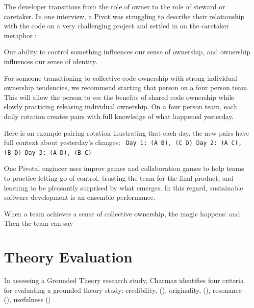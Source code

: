 \begin{table}[]
The developer transitions from the role of owner to the role of steward or caretaker. In one interview, a Pivot was struggling to describe their relationship with the code on a very challenging project and settled in on the caretaker metaphor : 

Our ability to control something influences our sense of ownership, and ownership influences our sense of identity. 

For someone transitioning to collective code ownership with strong individual ownership tendencies, we recommend starting that person on a four person team. This will allow the person to see the benefits of shared code ownership while slowly practicing releasing individual ownership. On a four person team, each daily rotation creates pairs with full knowledge of what happened yesterday.  

Here is an example pairing rotation illustrating that each day, the new pairs have full context about yesterday's changes:
\texttt{
Day 1: (A B), (C D)
Day 2: (A C), (B D)
Day 3: (A D), (B C)
}

One Pivotal engineer uses improv games and collaboration games to help teams to practice letting go of control, trusting the team for the final product, and learning to be pleasantly surprised by what emerges. In this regard, sustainable software development is an ensemble performance. 

When a team achieves a sense of collective ownership, the magic happens:  and  Then the team can say 
\section{Theory Evaluation}
\label{TheoryEvaluation}

In assessing a Grounded Theory research study, Charmaz identifies four criteria for evaluating a grounded theory study: credibility, (), originality, (), resonance (), usefulness () \cite{StolGTinSE}. 


\end{table}
